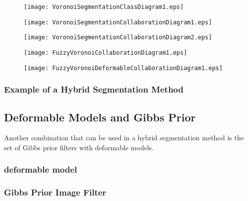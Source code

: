 \begin{figure}
\center
\texttt{[image: VoronoiSegmentationClassDiagram1.eps]}
\label{fig:UMLVoronoiSegmentationClassFilter}
\end{figure}

\begin{figure}
\center
\texttt{[image: VoronoiSegmentationCollaborationDiagram1.eps]}
\label{fig:UMLClassesforImplementationofVoronoiDiagramFilter}
\end{figure}


\begin{figure}
\center
\texttt{[image: VoronoiSegmentationCollaborationDiagram2.eps]}
\label{fig:UMLCollaborationDiagramoftheVoronoiSegmentationFilter}
\end{figure}


\begin{figure}
\center
\texttt{[image: FuzzyVoronoiCollaborationDiagram1.eps]}
\label{fig:UMLHybridMethodDiagram1}
\end{figure}

\begin{figure}
\center
\texttt{[image: FuzzyVoronoiDeformableCollaborationDiagram1.eps]}
\label{fig:UMLHybridMethodDiagram2}
\end{figure}



\subsubsection{Example of a Hybrid Segmentation Method}
\label{sec:HybridMethod1:Example}

\ifitkFullVersion

\fi



\subsection{Deformable Models and Gibbs Prior}

Another combination that can be used in a hybrid segmentation method is the
set of Gibbs prior filters with deformable models.

\subsubsection{deformable model}
\ifitkFullVersion

\fi


\subsubsection{Gibbs Prior Image Filter}
\ifitkFullVersion

\fi

